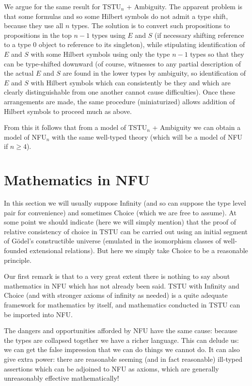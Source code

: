 \documentclass[12pt]{article}
\begin{document}
We argue for the same result for TSTU$_n$ + Ambiguity.  The apparent problem is that some formulas and so some Hilbert symbols do not admit a type shift, because they use all $n$ types.  The solution is to convert such propositions
to propositions in the top $n-1$ types using $E$ and $S$ (if necessary shifting reference to a type 0 object to reference to its singleton), while stipulating identification of $E$ and $S$ with some Hilbert symbols using only the type
$n-1$ types so that they can be type-shifted downward (of course, witnesses to any partial description of the actual $E$ and $S$ are found in the lower types by ambiguity, so identification of $E$ and $S$ with Hilbert symbols which can consistently be they and which are clearly distinguishable from one another cannot cause difficulties).  Once these arrangements are made, the same procedure (miniaturized) allows addition of Hilbert symbols to proceed much as above.

From this it follows that from a model of  TSTU$_n$ + Ambiguity we can obtain a model of NFU$_n$  with the same well-typed theory (which will be a model of NFU if $n \geq 4$).

\section{Mathematics in NFU}

In this section we will usually suppose Infinity (and so can suppose the type level pair for convenience) and sometimes Choice (which we are free to assume).  At some point we should indicate (here we will simply mention)
that the proof of relative consistency of choice in TSTU can be carried out using an initial segment of  G\"odel's constructible universe (emulated in the isomorphism classes of well-founded extensional relations).  But here we simply take Choice to be a reasonable principle.

Our first remark is that to a very great extent there is nothing to say about mathematics in NFU which has not already been said.  TSTU with Infinity and Choice (and with stronger axioms of infinity as needed) is a quite adequate framework for mathematics by itself, and mathematics conducted in TSTU can be imported into NFU.

The dangers and opportunities afforded by NFU have the same cause:  because the types are collapsed together we have a richer language.  This can delude us:  we can get the false impression that we can do things we cannot do.
It can also give extra power:  there are reasonable seeming (and in fact reasonable) ill-typed assertions which can be adjoined to NFU as axioms, which are generally unreasonably effective mathematically!
\end{document}
